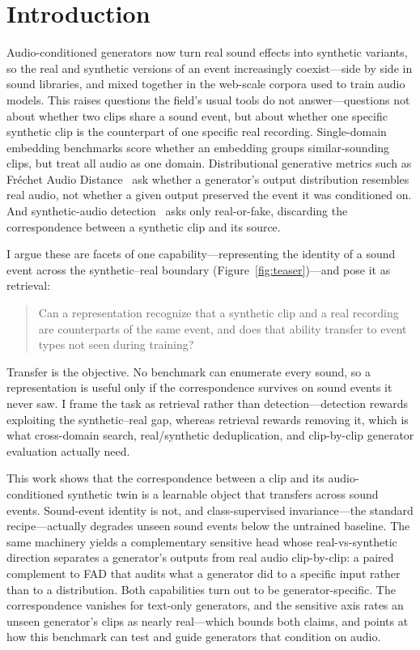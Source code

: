 \documentclass{article}
\begin{document}
\section{Introduction}
Audio-conditioned generators now turn real sound effects into synthetic variants, so the real and
synthetic versions of an event increasingly coexist---side by side in sound libraries, and mixed
together in the web-scale corpora used to train audio models. This raises questions the field's usual
tools do not answer---questions not about whether two clips share a sound event, but about
whether one specific synthetic clip is the counterpart of one specific real recording.
Single-domain embedding benchmarks
\citep{turian2022hear,heigold2026mseb} score whether an embedding groups similar-sounding clips, but
treat all audio as one domain. Distributional generative
metrics such as Fr\'echet Audio Distance~\citep{kilgour2019fad} ask whether a generator's
output distribution resembles real audio, not whether a given output preserved the event it
was conditioned on. And synthetic-audio detection~\citep{ouajdi2024deepfake,yin2025envsdd} asks only
real-or-fake, discarding the correspondence between a synthetic clip and its source.

I argue these are facets of one capability---representing the identity of a sound event across
the synthetic--real boundary (Figure~\ref{fig:teaser})---and pose it as retrieval:
\begin{quote}
Can a representation recognize that a synthetic clip and a real recording are counterparts of
the same event, and does that ability transfer to event types not seen during training?
\end{quote}
Transfer is the objective. No benchmark can enumerate every sound, so a representation is useful only if
the correspondence survives on sound events it never saw. I frame the task as retrieval rather than
detection---detection rewards exploiting the synthetic--real gap, whereas
retrieval rewards removing it, which is what cross-domain search, real/synthetic
deduplication, and clip-by-clip generator evaluation actually need.

This work shows that the correspondence between a clip and its audio-conditioned
synthetic twin is a learnable object that transfers across sound events. Sound-event identity is not, and
class-supervised invariance---the standard recipe---actually degrades unseen sound events below the
untrained baseline. The same machinery yields a complementary sensitive head whose
real-vs-synthetic direction separates a generator's outputs from real audio clip-by-clip: a paired
complement to FAD that audits what a generator did to a specific input rather than to a
distribution. Both capabilities turn out to be generator-specific. The correspondence vanishes for
text-only generators, and the sensitive axis rates an unseen generator's clips as nearly
real---which bounds both claims, and points at how this benchmark can test and guide generators
that condition on audio.
\end{document}
